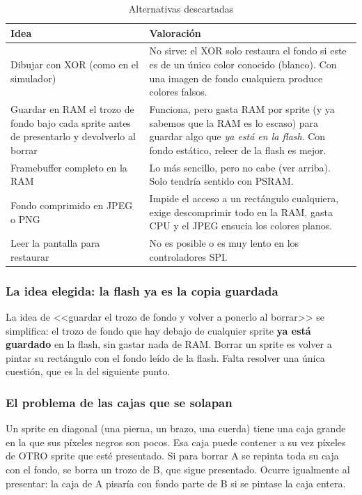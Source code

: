 \begin{table}[H]
	\centering
	\begin{tabular}{p{4.2cm}p{9cm}}
		\toprule
		Idea & Valoración \\
		\midrule
		Dibujar con XOR (como en el simulador) & No sirve: el XOR solo restaura el fondo si este es de un único color conocido (blanco). Con una imagen de fondo cualquiera produce colores falsos. \\
		Guardar en RAM el trozo de fondo bajo cada sprite antes de presentarlo y devolverlo al borrar & Funciona, pero gasta RAM por sprite (y ya sabemos que la RAM es lo escaso) para guardar algo que \emph{ya está en la flash}. Con fondo estático, releer de la flash es mejor. \\
		Framebuffer completo en la RAM & Lo más sencillo, pero no cabe (ver arriba). Solo tendría sentido con PSRAM. \\
		Fondo comprimido en JPEG o PNG & Impide el acceso a un rectángulo cualquiera, exige descomprimir todo en la RAM, gasta CPU y el JPEG ensucia los colores planos. \\
		Leer la pantalla para restaurar & No es posible o es muy lento en los controladores SPI. \\
		\bottomrule
	\end{tabular}
	\caption{Alternativas descartadas}
	\label{tab:F6I01Descartadas}
\end{table}

\subsubsection{La idea elegida: la flash ya es la copia guardada}

La idea de <<guardar el trozo de fondo y volver a ponerlo al borrar>> se simplifica: el trozo de fondo que hay debajo de cualquier sprite \textbf{ya está guardado} en la flash, sin gastar nada de RAM. Borrar un sprite es volver a pintar su rectángulo con el fondo leído de la flash. Falta resolver una única cuestión, que es la del siguiente punto.

\subsubsection{El problema de las cajas que se solapan}

Un sprite en diagonal (una pierna, un brazo, una cuerda) tiene una caja grande en la que sus píxeles negros son pocos. Esa caja puede contener a su vez píxeles de OTRO sprite que esté presentado. Si para borrar A se repinta toda su caja con el fondo, se borra un trozo de B, que sigue presentado. Ocurre igualmente al presentar: la caja de A pisaría con fondo parte de B si se pintase la caja entera.

